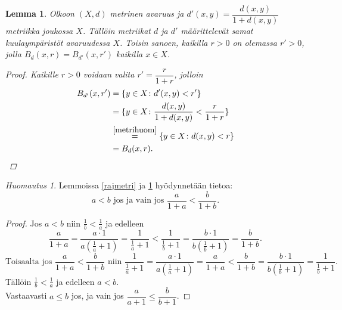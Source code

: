 \documentclass[12pt,a4paper,leqno]{report}
\newcommand{\R}{\mathbb{R}}
\theoremstyle{plain}
\newtheorem{lem}[equation]{Lemma}
\theoremstyle{definition}
\theoremstyle{remark}
\newtheorem{huom}[equation]{Huomautus}
\begin{document}
\begin{lem}\label{rajmetri2}
Olkoon $(X,d)$ metrinen avaruus ja $d'(x,y)=\dfrac{d(x,y)}{1+d(x,y)}$ metriikka joukossa $X$. Tällöin metriikat $d$ ja $d'$ määrittelevät samat kuulaympäristöt avaruudessa $X$. 
Toisin sanoen, kaikilla $r>0$ on olemassa $r'>0$, jolla $B_d(x,r)=B_{d'}(x,r') $ kaikilla $x\in X$.
\begin{proof} %
%
Kaikille $r>0$ voidaan valita $r'=\dfrac{r}{1+r}$, jolloin
\begin{equation*}
\begin{split}
B_{d'}(x,r')&=\{y\in X\colon d'(x,y)< r'\}\\
&=\{y\in X\colon \dfrac{d(x,y)}{1+d(x,y)}<\frac{r}{1+r}\}\\
&\overset{\ref{metrihuom}}{=}\{y\in X\colon d(x,y)< r\}\\
&=B_d(x,r).
\end{split}
\end{equation*}
\end{proof}
\end{lem}
\begin{huom}\label{metrihuom}Lemmoissa  \ref{rajmetri} ja \ref{rajmetri2} hyödynnetään tietoa: 
$$a< b\text{ jos ja vain jos } \dfrac{a}{1+a}< \dfrac{b}{1+b}.$$

\begin{proof}
Jos $a< b$ niin $\frac{1}{b}< \frac{1}{a}$ ja edelleen
$$\dfrac{a}{1+a}=\dfrac{a \cdot 1}{a(\frac{1}{a}+1)}=\dfrac{ 1}{\frac{1}{a}+1}< \dfrac{ 1}{\frac{1}{b}+1}=\dfrac{ b\cdot 1}{b(\frac{1}{b}+1)}=\dfrac{b}{1+b}.$$
$$\text{Toisaalta jos }\dfrac{a}{1+a}< \dfrac{b}{1+b}\text{ niin }
\dfrac{ 1}{\frac{1}{a}+1}=\dfrac{ a\cdot 1}{a(\frac{1}{a}+1)}=\dfrac{a}{1+a}<\dfrac{b}{1+b}=\dfrac{ b\cdot 1}{b(\frac{1}{b}+1)}= \dfrac{ 1}{\frac{1}{b}+1}.$$
Tällöin $\frac{1}{b}<\frac{1}{a} $ ja edelleen $a< b.$\\
Vastaavasti $a\leq b$ jos, ja vain jos $\dfrac{a}{a+1}\leq \dfrac{b}{b+1}$.
\end{proof}
\end{huom}
\end{document}
